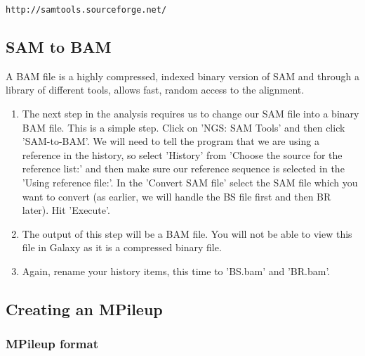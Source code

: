 \documentclass[12pt,a4paper]{article}
\begin{document}
\texttt{http://samtools.sourceforge.net/}

\subsection{SAM to BAM}

A BAM file is a highly compressed, indexed binary version of SAM and
through a library of different tools, allows fast, random access to
the alignment.
\begin{enumerate}
	\item The next step in the analysis requires us to change our
          SAM file into a binary BAM file. This is a simple
          step. Click on 'NGS: SAM Tools' and then click
          'SAM-to-BAM'. We will need to tell the program that we are
          using a reference in the history, so select 'History' from
          'Choose the source for the reference list:' and then make
          sure our reference sequence is selected in the 'Using
          reference file:'. In the 'Convert SAM file' select the SAM
          file which you want to convert (as earlier, we will handle
          the BS file first and then BR later). Hit 'Execute'.
	\item The output of this step will be a BAM file. You will
          not be able to view this file in Galaxy as it is a
          compressed binary file.
	\item Again, rename your history items, this time to 'BS.bam'
          and 'BR.bam'.
\end{enumerate}

\subsection{Creating an MPileup}

\subsubsection{MPileup format}
\end{document}
